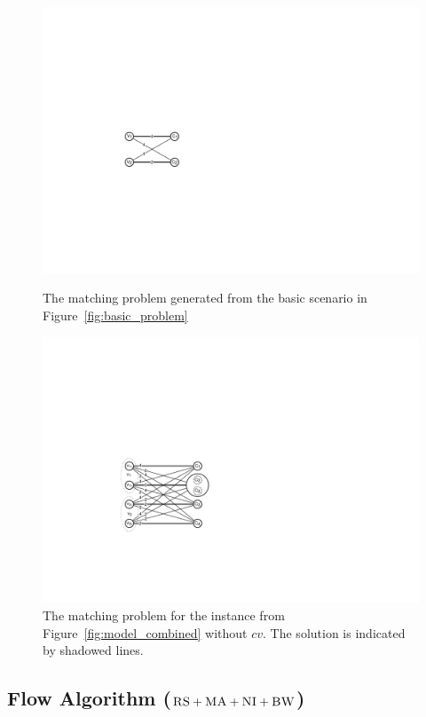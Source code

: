 \documentclass[9pt,twocolumn]{scrartcl}
\newcommand{\CC}{\textsc{NI}}
\newcommand{\RS}{\textsc{RS}}
\newcommand{\BW}{\textsc{BW}}
\newcommand{\MA}{\textsc{MA}}
\begin{document}
\begin{figure}
\begin{minipage}[b]{0.49\linewidth}
\centering
\includegraphics[width =\columnwidth]{figs/matching_basic}
\caption{The matching problem generated from the basic scenario in
Figure~\ref{fig:basic_problem}}
\label{fig:matching_basic}
\end{minipage}
\quad
\begin{minipage}[b]{0.49\linewidth}
\includegraphics[width = \columnwidth]{figs/matching}
\caption{The matching problem for the instance from
Figure~\ref{fig:model_combined} without $cv$. The solution is indicated by
shadowed lines.}
\label{fig:matching}
\end{minipage}
\end{figure}

\subsection{Flow Algorithm ($\RS+\MA+\CC+\BW$)}
\end{document}
